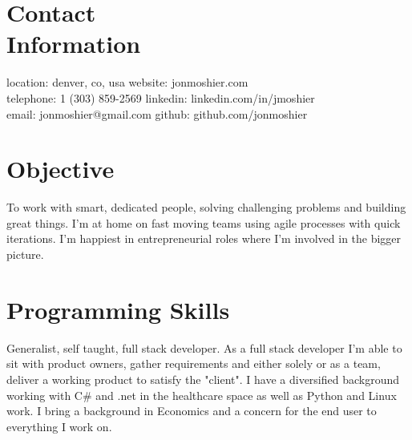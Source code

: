 \documentclass[margin,line]{resume}
\begin{document}
\begin{resume}

    \section{\mysidestyle Contact\\Information}
    location: denver, co, usa   \hfill website: jonmoshier.com\vspace{0mm}\\\vspace{0mm}%
    telephone: 1 (303) 859-2569 \hfill linkedin: linkedin.com/in/jmoshier\vspace{0mm}\\\vspace{0mm}%
    email: jonmoshier@gmail.com \hfill github: github.com/jonmoshier\vspace{0mm}\\\vspace{-4.5mm}%

    \section{\mysidestyle Objective}
 To work with smart, dedicated people, solving challenging problems and building great things. I'm at home on fast moving teams using agile processes with quick iterations. I'm happiest in entrepreneurial roles where I'm involved in the bigger picture.
    \section{\mysidestyle Programming Skills} 
	Generalist, self taught, full stack developer. As a full stack developer I'm able to sit with product owners, gather requirements and either solely or as a team, deliver a working product to satisfy the "client". I have a diversified background working with C\# and .net in the healthcare space as well as Python and Linux work. I bring a background in Economics and a concern for the end user to everything I work on.

\end{resume}
\end{document}

